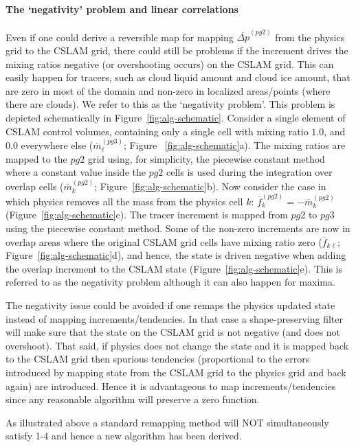 \documentclass[draft,linenumbers]{agujournal}
\begin{document}
\paragraph{The `negativity' problem and linear correlations} 
Even if one could derive a reversible map for mapping ${\overline{\Delta p}}^{(pg2)}$ from the physics grid to the CSLAM grid, there could still be problems if the increment drives the mixing ratios negative (or overshooting occurs) on the CSLAM grid. This can easily happen for tracers, such as cloud liquid amount and cloud ice amount, that are zero in most of the domain and non-zero in localized areas/points (where there are clouds). We refer to this as the `negativity problem'. This problem is depicted schematically in Figure~\ref{fig:alg-schematic}. Consider a single element of CSLAM control volumes, containing only a single cell with mixing ratio $1.0$, and $0.0$ everywhere else ($\overline{m}^{(pg3)}_\ell$; Figure ~\ref{fig:alg-schematic}a). The mixing ratios are mapped to the $pg2$ grid using, for simplicity, the piecewise constant method where a constant value inside the $pg2$ cells is used during the integration over overlap cells ($\overline{m}^{(pg2)}_k$; Figure~\ref{fig:alg-schematic}b). Now consider the case in which physics removes all the mass from the physics cell $k$: $\overline{f}^{(pg2)}_k=-\overline{m}^{(pg2)}_k$ (Figure~\ref{fig:alg-schematic}c). The tracer increment is mapped from $pg2$ to $pg3$ using the piecewise constant method. Some of the non-zero increments are now in overlap areas where the original CSLAM grid cells have mixing ratio zero ($\overline{f}_{k\ell}$; Figure~\ref{fig:alg-schematic}d), and hence, the state is driven negative when adding the overlap increment to the CSLAM state (Figure~\ref{fig:alg-schematic}e).  This is referred to as the negativity problem although it can also happen for maxima.

The negativity issue could be avoided if one remaps the physics updated state instead of mapping increments/tendencies. In that case a shape-preserving filter will make sure that the state on the CSLAM grid is not negative (and does not overshoot). That said, if physics does not change the state and it is mapped back to the CSLAM grid then spurious tendencies (proportional to the errors introduced by mapping state from the CSLAM grid to the physics grid and back again) are introduced. Hence it is advantageous to map increments/tendencies since any reasonable algorithm will preserve a zero function.

As illustrated above a standard remapping method will NOT simultaneously satisfy 1-4 and hence a new algorithm has been derived.
\end{document}
